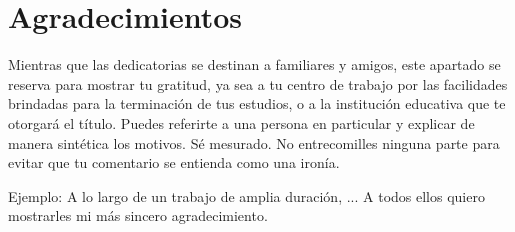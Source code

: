 \chapter*{Agradecimientos}
\thispagestyle{empty}
\setcounter{page}{0}

\noindent \textcolor[rgb]{0,0,1}{Mientras que las dedicatorias se destinan a familiares y amigos, este apartado se reserva para mostrar tu gratitud, ya sea a tu centro de trabajo por las facilidades brindadas para la terminación de tus estudios, o a la institución educativa que te otorgará el título. Puedes referirte a una persona en particular y explicar de manera sintética los motivos. Sé mesurado. No entrecomilles ninguna parte para evitar que tu comentario se entienda como una ironía.}

\noindent \textcolor[rgb]{0,0,1}{Ejemplo:\newline
	A lo largo de un trabajo de amplia duración, ...\newline
	A todos ellos quiero mostrarles mi más sincero agradecimiento.}